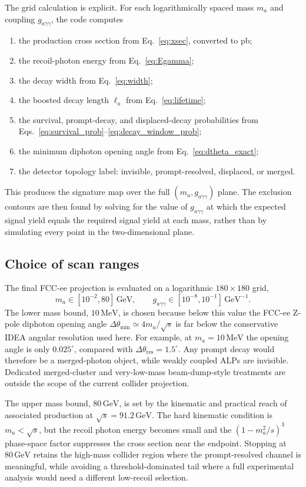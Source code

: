 \documentclass[12pt,a4paper]{article}
\newcommand{\gagg}{g_{a\gamma\gamma}}
\newcommand{\ma}{m_a}
\newcommand{\sqrts}{\sqrt{s}}
\newcommand{\MeV}{\,\text{MeV}}
\newcommand{\GeV}{\,\text{GeV}}
\begin{document}
The grid calculation is explicit. For each logarithmically spaced mass $m_a$
and coupling $\gagg$, the code computes
\begin{enumerate}
    \item the production cross section from Eq.~\eqref{eq:xsec}, converted to pb;
    \item the recoil-photon energy from Eq.~\eqref{eq:Egamma};
    \item the decay width from Eq.~\eqref{eq:width};
    \item the boosted decay length $\ell_a$ from Eq.~\eqref{eq:lifetime};
    \item the survival, prompt-decay, and displaced-decay probabilities from
    Eqs.~\eqref{eq:survival_prob}--\eqref{eq:decay_window_prob};
    \item the minimum diphoton opening angle from Eq.~\eqref{eq:dtheta_exact};
    \item the detector topology label: invisible, prompt-resolved, displaced,
    or merged.
\end{enumerate}
This produces the signature map over the full $(m_a,\gagg)$ plane. The exclusion
contours are then found by solving for the value of $\gagg$ at which the
expected signal yield equals the required signal yield at each mass, rather
than by simulating every point in the two-dimensional plane.

\subsection{Choice of scan ranges}

The final FCC-ee projection is evaluated on a logarithmic
$180\times180$ grid,
\begin{equation}
    \ma \in [10^{-2},80]\GeV,
    \qquad
    \gagg \in [10^{-8},10^{-1}]\GeV^{-1}.
    \label{eq:scan_range}
\end{equation}
The lower mass bound, $10\MeV$, is chosen because below this value the
FCC-ee Z-pole diphoton opening angle
$\Delta\theta_\mathrm{min}\simeq4\ma/\sqrts$ is far below the conservative
IDEA angular resolution used here. For example, at $m_a=10\MeV$ the opening
angle is only $0.025^\circ$, compared with
$\Delta\theta_\mathrm{res}=1.5^\circ$. Any prompt decay would therefore be a
merged-photon object, while weakly coupled ALPs are invisible. Dedicated
merged-cluster and very-low-mass beam-dump-style treatments are outside the
scope of the current collider projection.

The upper mass bound, $80\GeV$, is set by the kinematic and practical reach of
associated production at $\sqrts=91.2\GeV$. The hard kinematic condition is
$\ma<\sqrts$, but the recoil photon energy becomes small and the
$(1-\ma^2/s)^3$ phase-space factor suppresses the cross section near the
endpoint. Stopping at $80\GeV$ retains the high-mass collider region where the
prompt-resolved channel is meaningful, while avoiding a threshold-dominated
tail where a full experimental analysis would need a different low-recoil
selection.
\end{document}
